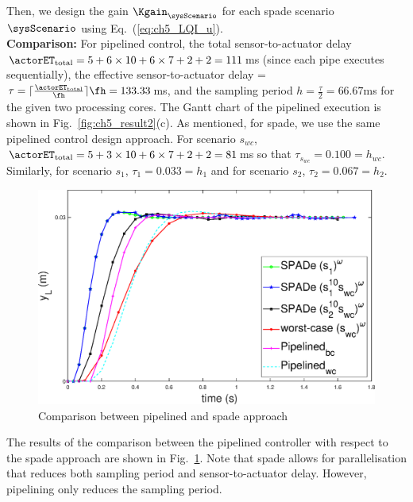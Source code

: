 Then, we design the gain $\Kgain_{\sysScenario}$ for each \gls{spade} scenario $\sysScenario$ using  Eq.~(\ref{eq:ch5_LQI_u}).
\\[1ex]
\noindent\textbf{Comparison:}
For pipelined control, the total sensor-to-actuator delay $\actorET_{\text{total}}= 5 + 6\times 10+6\times 7+2+2=111$ms (since each pipe executes sequentially), the effective sensor-to-actuator delay = $\tau=\lceil \frac{\actorET_{\text{total}}}{\fh}\rceil \fh= 133.33$ms, and the sampling period $h=\frac{\tau}{2}=66.67$ms for the given two processing cores. The Gantt chart of the pipelined execution is shown in Fig.~\ref{fig:ch5_result2}(c). As mentioned, for \gls{spade}, we use the same pipelined control design approach. For scenario $s_{wc}$, $\actorET_{\text{total}}=5+3\times 10+6\times 7+2+2=81$ms so that $\tau_{s_{wc}}=0.100=h_{wc}$. Similarly, for scenario $s_1$, $\tau_1=0.033=h_1$ and for scenario $s_2$,   $\tau_2=0.067=h_2$.

\begin{figure}[t]
            \centerline{\includegraphics[scale=0.5]{images/res_fig10.eps}}
            \vspace{-1ex}
            \caption{Comparison between pipelined and \gls{spade} approach}
            \label{fig:ch5_comparison}
\end{figure}

The results of the comparison between the pipelined controller with respect to the \gls{spade} approach are shown in Fig.~\ref{fig:ch5_comparison}. 
Note that \gls{spade} allows for parallelisation that reduces both sampling period and sensor-to-actuator delay. 
However, pipelining only reduces the sampling period.

